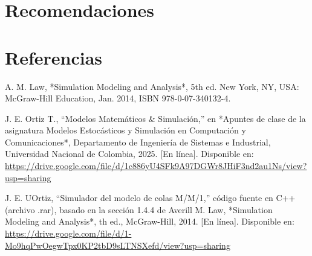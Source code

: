 \documentclass{article}
\begin{document}

\section{Recomendaciones}\label{secrecomen}

\section{Referencias}
\renewcommand{\refname}{}
\begin{thebibliography}{9}

 \label{ref:modSim} A. M. Law, *Simulation Modeling and Analysis*, 5th ed. 
New York, NY, USA: McGraw-Hill Education, Jan. 2014, ISBN 978-0-07-340132-4. 

 \label{ref:matSim} J. E. Ortiz T., “Modelos Matemáticos \& Simulación,”
 en *Apuntes de clase de la asignatura Modelos Estocásticos y Simulación en 
 Computación y Comunicaciones*, Departamento de Ingeniería de Sistemas e Industrial, 
 Universidad Nacional de Colombia, 2025. [En línea]. Disponible en: 
 \url{https://drive.google.com/file/d/1c886yU4SFk9A97DGWr8JHiF3nd2au1Ns/view?usp=sharing}

  \label{ref:cimColas} J. E. UOrtiz, “Simulador del modelo de colas M/M/1,” 
 código fuente en C++ (archivo .rar), basado en la sección 
 1.4.4 de Averill M. Law, *Simulation Modeling and Analysis*, 
 th ed., McGraw-Hill, 2014. [En línea]. Disponible en: 
 \url{https://drive.google.com/file/d/1-Mo9hqPwOegwTpx0KP2tbD9sLTNSXefd/view?usp=sharing}



\end{thebibliography}
\end{document}
